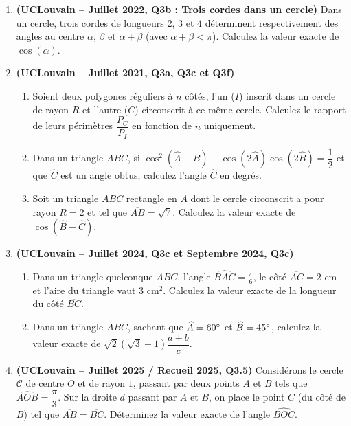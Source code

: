 \begin{enumerate}[label=\textbf{Exercice 4.\arabic* --}, align=left, leftmargin=*]
    \item \textbf{(UCLouvain -- Juillet 2022, Q3b : Trois cordes dans un cercle)} Dans un cercle, trois cordes de longueurs $2$, $3$ et $4$ déterminent respectivement des angles au centre $\alpha$, $\beta$ et $\alpha+\beta$ (avec $\alpha+\beta < \pi$). Calculez la valeur exacte de $\cos(\alpha)$.

    \item \textbf{(UCLouvain -- Juillet 2021, Q3a, Q3c et Q3f)}
    \begin{enumerate}
        \item Soient deux polygones réguliers à $n$ côtés, l'un ($I$) inscrit dans un cercle de rayon $R$ et l'autre ($C$) circonscrit à ce même cercle. Calculez le rapport de leurs périmètres $\dfrac{P_C}{P_I}$ en fonction de $n$ uniquement.
        \item Dans un triangle $ABC$, si $\cos^2(\widehat{A} - \widehat{B}) - \cos(2\widehat{A})\cos(2\widehat{B}) = \dfrac{1}{2}$ et que $\widehat{C}$ est un angle obtus, calculez l'angle $\widehat{C}$ en degrés.
        \item Soit un triangle $ABC$ rectangle en $A$ dont le cercle circonscrit a pour rayon $R = 2$ et tel que $\overline{AB} = \sqrt{7}$. Calculez la valeur exacte de $\cos(\widehat{B} - \widehat{C})$.
    \end{enumerate}

    \item \textbf{(UCLouvain -- Juillet 2024, Q3c et Septembre 2024, Q3c)}
    \begin{enumerate}
        \item Dans un triangle quelconque $ABC$, l'angle $\widehat{BAC} = \frac{\pi}{6}$, le côté $\overline{AC} = 2\text{ cm}$ et l'aire du triangle vaut $3\text{ cm}^2$. Calculez la valeur exacte de la longueur du côté $\overline{BC}$.
        \item Dans un triangle $ABC$, sachant que $\widehat{A} = 60\degree$ et $\widehat{B} = 45\degree$, calculez la valeur exacte de $\sqrt{2}(\sqrt{3}+1)\dfrac{a+b}{c}$.
    \end{enumerate}

    \item \textbf{(UCLouvain -- Juillet 2025 / Recueil 2025, Q3.5)} Considérons le cercle $\mathcal{C}$ de centre $O$ et de rayon $1$, passant par deux points $A$ et $B$ tels que $\widehat{AOB} = \dfrac{\pi}{3}$. Sur la droite $d$ passant par $A$ et $B$, on place le point $C$ (du côté de $B$) tel que $\overline{AB} = \overline{BC}$. Déterminez la valeur exacte de l'angle $\widehat{BOC}$.


\end{enumerate}
